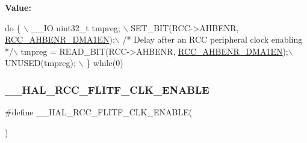 {\bfseries Value\+:}
\begin{DoxyCode}
\textcolor{keywordflow}{do} \{ \(\backslash\)
                                        \_\_IO uint32\_t tmpreg; \(\backslash\)
                                        SET\_BIT(RCC->AHBENR, \hyperlink{group___peripheral___registers___bits___definition_gac8c3053f1ce37c9f643f0e31471927ea}{RCC\_AHBENR\_DMA1EN});\(\backslash\)
                                        \textcolor{comment}{/* Delay after an RCC peripheral clock enabling */}\(\backslash\)
                                        tmpreg = READ\_BIT(RCC->AHBENR, 
      \hyperlink{group___peripheral___registers___bits___definition_gac8c3053f1ce37c9f643f0e31471927ea}{RCC\_AHBENR\_DMA1EN});\(\backslash\)
                                        UNUSED(tmpreg); \(\backslash\)
                                      \} \textcolor{keywordflow}{while}(0)
\end{DoxyCode}
\mbox{\label{group___r_c_c___a_h_b___clock___enable___disable_ga17a2870f308b7ccc5aba84d963484bac}} 
\subsubsection{\texorpdfstring{\+\_\+\+\_\+\+H\+A\+L\+\_\+\+R\+C\+C\+\_\+\+F\+L\+I\+T\+F\+\_\+\+C\+L\+K\+\_\+\+E\+N\+A\+B\+LE}{\_\_HAL\_RCC\_FLITF\_CLK\_ENABLE}}
{\footnotesize\ttfamily \#define \+\_\+\+\_\+\+H\+A\+L\+\_\+\+R\+C\+C\+\_\+\+F\+L\+I\+T\+F\+\_\+\+C\+L\+K\+\_\+\+E\+N\+A\+B\+LE(\begin{DoxyParamCaption}{ }\end{DoxyParamCaption})}

